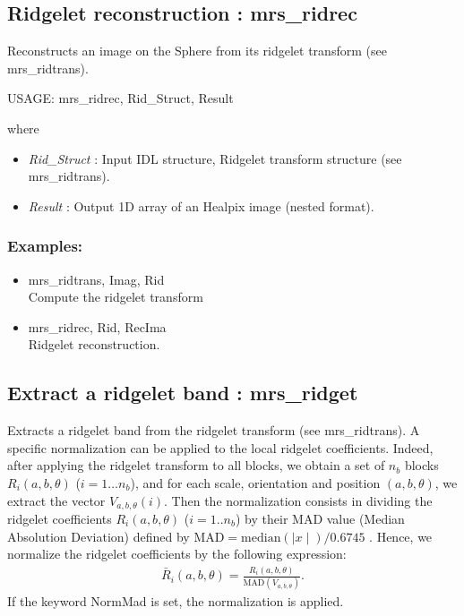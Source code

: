 \subsection{Ridgelet reconstruction : mrs\_ridrec}
Reconstructs an image on the Sphere from its ridgelet transform (see mrs\_ridtrans).   
{\bf
\begin{center}
     USAGE:  mrs\_ridrec, Rid\_Struct, Result 
\end{center}}
where
\begin{itemize}
\item {\em Rid\_Struct} : Input IDL structure, Ridgelet transform structure (see mrs\_ridtrans).
\item {\em Result} : Output 1D array of an Healpix image (nested format).
\end{itemize}
\subsubsection*{Examples:} 
\begin{itemize}
\item mrs\_ridtrans, Imag, Rid   \\
Compute the ridgelet transform
\item mrs\_ridrec, Rid, RecIma \\
Ridgelet reconstruction.
\end{itemize}



\subsection{Extract a ridgelet band : mrs\_ridget}
Extracts a ridgelet band from the ridgelet transform (see mrs\_ridtrans). A specific normalization can be applied 
to the local ridgelet coefficients. Indeed, after applying the ridgelet transform to all blocks, we obtain a set of 
$n_b$ blocks $R_i(a,b,\theta)$ ($i=1 \dots n_b$), and for each scale, orientation and position $(a,b,\theta)$, 
we extract the vector $V_{a,b,\theta}(i)$. Then the normalization consists in dividing the ridgelet coefficients 
$R_i(a,b,\theta)$ ($i=1..n_b$) by their $\mathrm{MAD}$ value (Median Absolution Deviation) defined by $\mathrm{MAD} = \mathrm{median}(\mid x \mid )/0.6745$ \cite{astro:mad93}. 
Hence, we normalize the ridgelet coefficients by the following expression:
\begin{eqnarray}
\bar{R}_i(a,b,\theta) = \frac{R_i(a,b,\theta)}{\mathrm{MAD}(V_{a,b,\theta})}.
\end{eqnarray}
If the keyword NormMad is set, the normalization is applied.

